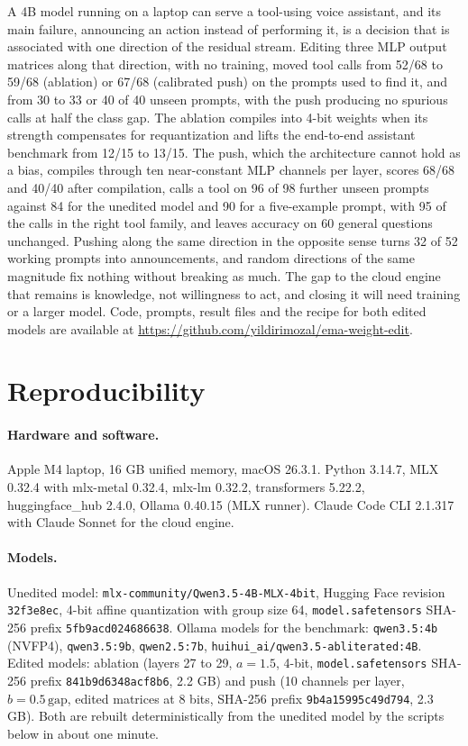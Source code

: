 \documentclass[11pt]{article}
\begin{document}
A 4B model running on a laptop can serve a tool-using voice assistant, and its main failure, announcing an action instead of performing it, is a decision that is associated with one direction of the residual stream. Editing three MLP output matrices along that direction, with no training, moved tool calls from 52/68 to 59/68 (ablation) or 67/68 (calibrated push) on the prompts used to find it, and from 30 to 33 or 40 of 40 unseen prompts, with the push producing no spurious calls at half the class gap. The ablation compiles into 4-bit weights when its strength compensates for requantization and lifts the end-to-end assistant benchmark from 12/15 to 13/15. The push, which the architecture cannot hold as a bias, compiles through ten near-constant MLP channels per layer, scores 68/68 and 40/40 after compilation, calls a tool on 96 of 98 further unseen prompts against 84 for the unedited model and 90 for a five-example prompt, with 95 of the calls in the right tool family, and leaves accuracy on 60 general questions unchanged. Pushing along the same direction in the opposite sense turns 32 of 52 working prompts into announcements, and random directions of the same magnitude fix nothing without breaking as much. The gap to the cloud engine that remains is knowledge, not willingness to act, and closing it will need training or a larger model. Code, prompts, result files and the recipe for both edited models are available at \url{https://github.com/yildirimozal/ema-weight-edit}.


\appendix
\section{Reproducibility}
\label{app:tekrar}

\paragraph{Hardware and software.} Apple M4 laptop, 16 GB unified memory, macOS 26.3.1. Python 3.14.7, MLX 0.32.4 with mlx-metal 0.32.4, mlx-lm 0.32.2, transformers 5.22.2, huggingface\_hub 2.4.0, Ollama 0.40.15 (MLX runner). Claude Code CLI 2.1.317 with Claude Sonnet for the cloud engine.

\paragraph{Models.} Unedited model: \texttt{mlx-community/Qwen3.5-4B-MLX-4bit}, Hugging Face revision \texttt{32f3e8ec}, 4-bit affine quantization with group size 64, \texttt{model.safetensors} SHA-256 prefix \texttt{5fb9acd024686638}. Ollama models for the benchmark: \texttt{qwen3.5:4b} (NVFP4), \texttt{qwen3.5:9b}, \texttt{qwen2.5:7b}, \texttt{huihui\_ai/qwen3.5-abliterated:4B}. Edited models: ablation (layers 27 to 29, $a=1.5$, 4-bit, \texttt{model.safetensors} SHA-256 prefix \texttt{841b9d6348acf8b6}, 2.2 GB) and push (10 channels per layer, $b=0.5\,\mathrm{gap}$, edited matrices at 8 bits, SHA-256 prefix \texttt{9b4a15995c49d794}, 2.3 GB). Both are rebuilt deterministically from the unedited model by the scripts below in about one minute.
\end{document}
